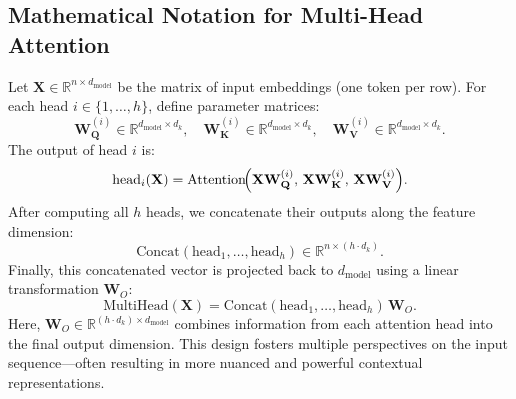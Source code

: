 \subsection{Mathematical Notation for Multi-Head Attention}
\noindent
Let $\mathbf{X} \in \mathbb{R}^{n \times d_\text{model}}$ be the matrix of input embeddings (one token per row). For each head $i \in \{1, \ldots, h\}$, define parameter matrices:
\[
\mathbf{W}_\mathbf{Q}^{(i)} \in \mathbb{R}^{d_\text{model} \times d_k}, \quad
\mathbf{W}_\mathbf{K}^{(i)} \in \mathbb{R}^{d_\text{model} \times d_k}, \quad
\mathbf{W}_\mathbf{V}^{(i)} \in \mathbb{R}^{d_\text{model} \times d_k}.
\]
The output of head $i$ is:
\[
\text{head}_i(\mathbf{X}) = \text{Attention}\!\Bigl(\mathbf{X}\mathbf{W}_\mathbf{Q}^{(i)},\, \mathbf{X}\mathbf{W}_\mathbf{K}^{(i)},\, \mathbf{X}\mathbf{W}_\mathbf{V}^{(i)}\Bigr).
\]
After computing all $h$ heads, we concatenate their outputs along the feature dimension:
\[
\text{Concat}(\text{head}_1, \ldots, \text{head}_h) \in \mathbb{R}^{n \times (h \cdot d_k)}.
\]
Finally, this concatenated vector is projected back to $d_\text{model}$ using a linear transformation $\mathbf{W}_O$:
\[
\text{MultiHead}(\mathbf{X}) 
= \text{Concat}(\text{head}_1, \ldots, \text{head}_h)\,\mathbf{W}_O.
\]
\noindent
Here, $\mathbf{W}_O \in \mathbb{R}^{(h \cdot d_k) \times d_\text{model}}$ combines information from each attention head into the final output dimension. This design fosters multiple perspectives on the input sequence—often resulting in more nuanced and powerful contextual representations.

